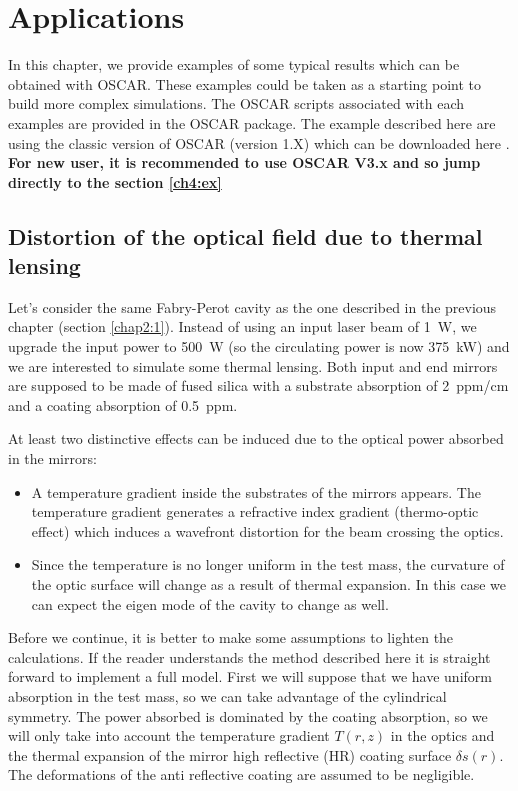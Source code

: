 \chapter{Applications}

In this chapter, we provide examples of some typical results which can be obtained with OSCAR. These examples could be taken as a starting point to build more complex simulations. The OSCAR scripts associated with each examples are provided in the OSCAR package. The example described here are using the classic version of OSCAR (version 1.X) which can be downloaded here \cite{OS_down}.\textbf{ For new user, it is recommended to use OSCAR V3.x and so jump directly to the section \ref{ch4:ex}}

\section{Distortion of the optical field due to thermal lensing}\label{cha3.1}

Let's consider the same Fabry-Perot cavity as the one described in the previous chapter (section \ref{chap2:1}). Instead of using an input laser beam of 1~W, we upgrade the input power to 500~W (so the circulating power is now 375~kW) and we are interested to simulate some thermal lensing. Both input and end mirrors are supposed to be made of fused silica with a substrate absorption of 2~ppm/cm and a coating absorption of 0.5~ppm.

At least two distinctive effects can be induced due to the optical power absorbed in the mirrors:
\begin{itemize}
  \item A temperature gradient inside the substrates of the mirrors appears. The temperature gradient generates a refractive index gradient (thermo-optic effect) which induces a wavefront distortion for the beam crossing the optics.
  \item Since the temperature is no longer uniform in the test mass, the curvature of the optic surface will change as a result of thermal expansion. In this case we can expect the eigen mode of the cavity to change as well.
\end{itemize}

Before we continue, it is better to make some assumptions to lighten the calculations. If the reader understands the method described here it is straight forward to implement a full model. First we will suppose that we have uniform absorption in the test mass, so we can take advantage of the cylindrical symmetry. The power absorbed is dominated by the coating absorption, so we will only take into account the temperature gradient $T(r,z)$ in the optics and the thermal expansion of the mirror high reflective (HR) coating surface $\delta s(r)$. The deformations of the anti reflective coating are assumed to be negligible.

